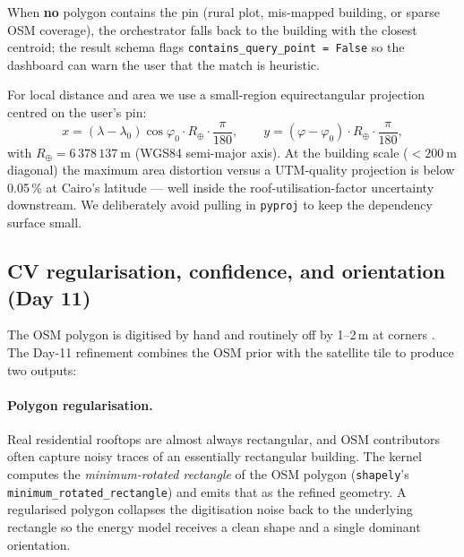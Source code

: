 When \textbf{no} polygon contains the pin (rural plot, mis-mapped
building, or sparse OSM coverage), the orchestrator falls back to the
building with the closest centroid; the result schema flags
\texttt{contains\_query\_point = False} so the dashboard can warn the
user that the match is heuristic.

For local distance and area we use a small-region equirectangular
projection centred on the user's pin:
\begin{equation}
x = (\lambda - \lambda_0) \cos\varphi_0 \cdot R_{\oplus}
       \cdot \frac{\pi}{180},
\qquad
y = (\varphi - \varphi_0) \cdot R_{\oplus} \cdot \frac{\pi}{180},
\label{eq:projection}
\end{equation}
with $R_{\oplus} = 6\,378\,137~\mathrm{m}$ (WGS84 semi-major axis).
At the building scale ($< 200~\mathrm{m}$ diagonal) the maximum area
distortion versus a UTM-quality projection is below 0.05\,\% at
Cairo's latitude --- well inside the roof-utilisation-factor
uncertainty downstream. We deliberately avoid pulling in
\texttt{pyproj} to keep the dependency surface small.

\subsection{CV regularisation, confidence, and orientation (Day 11)}
\label{sec:cv}

The OSM polygon is digitised by hand and routinely off by 1--2\,m at
corners \citep{osm-quality}. The Day-11 refinement combines the OSM
prior with the satellite tile to produce two outputs:

\paragraph{Polygon regularisation.}
Real residential rooftops are almost always rectangular, and OSM
contributors often capture noisy traces of an essentially rectangular
building. The kernel computes the \emph{minimum-rotated rectangle} of
the OSM polygon (\texttt{shapely}'s
\texttt{minimum\_rotated\_rectangle}) and emits that as the refined
geometry. A regularised polygon collapses the digitisation noise back
to the underlying rectangle so the energy model receives a clean
shape and a single dominant orientation.

